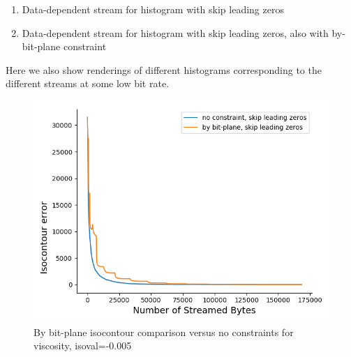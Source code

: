 \begin{enumerate}
  \item Data-dependent stream for histogram with skip leading zeros
  \item Data-dependent stream for histogram with skip leading zeros, also with by-bit-plane constraint
\end{enumerate}  
  Here we also show renderings of different histograms corresponding to the different streams at some low bit rate.

\begin{figure}
  \centering
  \includegraphics[width=0.8\linewidth]{resources/isocontour-error-by-bit-plane-viscosity.png}
  \caption {By bit-plane isocontour comparison versus no constraints for viscosity, isoval=-0.005}
  \label{fig:by_bit_plane_isocontour}
\end{figure}
